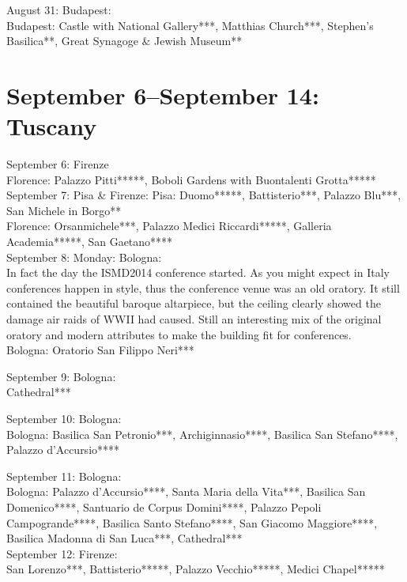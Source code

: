 August 31: Budapest:\\
Budapest: Castle with National Gallery***, Matthias Church***, Stephen's Basilica**, Great Synagoge \& Jewish Museum**

\section{September 6--September 14: Tuscany}
\label{Tuscany2014}

September 6: Firenze\\
Florence: Palazzo Pitti*****, Boboli Gardens with Buontalenti Grotta*****\\

September 7: Pisa \& Firenze:
Pisa: Duomo*****, Battisterio***, Palazzo Blu***, San Michele in Borgo**\\
Florence: Orsanmichele***, Palazzo Medici Riccardi*****, Galleria Academia*****, San Gaetano****\\

September 8: Monday: Bologna:\\
In fact the day the ISMD2014 conference started. As you might expect in Italy conferences happen in style, thus the conference venue was an old oratory. It still contained the beautiful baroque altarpiece, but the ceiling clearly showed the damage air raids of WWII had caused. Still an interesting mix of the original oratory and modern attributes to make the building fit for conferences.\\

Bologna: Oratorio San Filippo Neri***

September 9: Bologna:\\
Cathedral***

September 10: Bologna:\\
Bologna: Basilica San Petronio***, Archiginnasio****, Basilica San Stefano****, Palazzo d'Accursio****

September 11: Bologna:\\
Bologna: Palazzo d'Accursio****, Santa Maria della Vita***, Basilica San Domenico****, Santuario de Corpus Domini****, Palazzo Pepoli Campogrande****, Basilica Santo Stefano****, San Giacomo Maggiore****, Basilica Madonna di San Luca***, Cathedral***\\

September 12: Firenze:\\
San Lorenzo***, Battisterio*****,  Palazzo Vecchio*****, Medici Chapel*****\\

